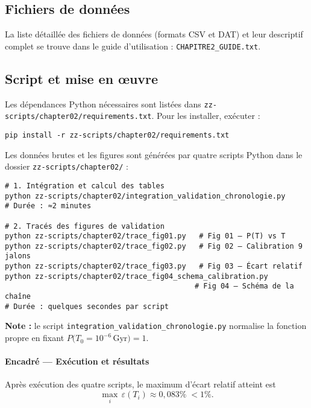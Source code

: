 \subsection{Fichiers de données}

La liste détaillée des fichiers de données (formats CSV et DAT) et leur descriptif complet se trouve dans le guide d’utilisation : \texttt{CHAPITRE2\_GUIDE.txt}.

\subsection{Script et mise en œuvre}

Les dépendances Python nécessaires sont listées dans \texttt{zz-scripts/chapter02/requirements.txt}.  
Pour les installer, exécuter :
\begin{verbatim}
pip install -r zz-scripts/chapter02/requirements.txt
\end{verbatim}

Les données brutes et les figures sont générées par quatre scripts Python dans le dossier \texttt{zz-scripts/chapter02/} :

\begin{verbatim}
# 1. Intégration et calcul des tables
python zz-scripts/chapter02/integration_validation_chronologie.py
# Durée : ≈2 minutes

# 2. Tracés des figures de validation
python zz-scripts/chapter02/trace_fig01.py   # Fig 01 – P(T) vs T
python zz-scripts/chapter02/trace_fig02.py   # Fig 02 – Calibration 9 jalons
python zz-scripts/chapter02/trace_fig03.py   # Fig 03 – Écart relatif
python zz-scripts/chapter02/trace_fig04_schema_calibration.py
                                            # Fig 04 – Schéma de la chaîne
# Durée : quelques secondes par script
\end{verbatim}

\noindent\textbf{Note :} le script \texttt{integration\_validation\_chronologie.py} normalise la fonction propre en fixant 
\(\displaystyle P\bigl(T_{0}=10^{-6}\,\mathrm{Gyr}\bigr)=1\).

\begin{mdframed}
  \paragraph{Encadré — Exécution et résultats}
  Après exécution des quatre scripts, le maximum d’écart relatif atteint est  
  \[
    \max_{i}\,\varepsilon(T_i)\approx0{,}083\%\;<1\%.
  \]
\end{mdframed}

